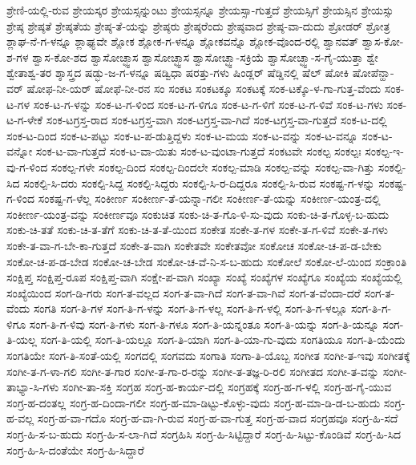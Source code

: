 {ಶ್ರೇಣಿ-ಯಲ್ಲಿ-ರುವ
ಶ್ರೇಯಸ್ಕರ
ಶ್ರೇಯಸ್ಸನ್ನುಂಟು
ಶ್ರೇಯಸ್ಸನ್ನೂ
ಶ್ರೇಯಸ್ಸಾ-ಗುತ್ತದೆ
ಶ್ರೇಯಸ್ಸಿಗೆ
ಶ್ರೇಯಸ್ಸಿನ
ಶ್ರೇಯಸ್ಸು
ಶ್ರೇಷ್ಠ
ಶ್ರೇಷ್ಠತೆ
ಶ್ರೇಷ್ಠತೆಯ
ಶ್ರೇಷ್ಠ-ತೆ-ಯನ್ನು
ಶ್ರೇಷ್ಠರು
ಶ್ರೇಷ್ಠರೆಂದು
ಶ್ರೇಷ್ಠವಾದ
ಶ್ರೇಷ್ಠ-ವಾ-ದುದು
ಶ್ರೋಡರ್
ಶ್ರೋತ್ರ
ಶ್ಲಾಘ-ನೆ-ಗ-ಳನ್ನೂ
ಶ್ಲಾಘ್ಯವೇ
ಶ್ಲೋಕ
ಶ್ಲೋಕ-ಗ-ಳನ್ನೂ
ಶ್ಲೋಕವನ್ನೊ
ಶ್ಲೋಕ-ವೊಂದ-ರಲ್ಲಿ
ಶ್ವಾನವತ್
ಶ್ವಾಸ-ಕೋ-ಶ-ಗಳ
ಶ್ವಾಸ-ಕೋ-ಶದ
ಶ್ವಾಸೋಚ್ಛ್ವಾಸ
ಶ್ವಾಸೋಚ್ಛ್ವಾಸ
ಶ್ವಾಸೋಚ್ಛ್ವಾ-ಸಕ್ರಿಯೆ
ಶ್ವಾಸೋಚ್ಛ್ವಾ-ಸ-ಗೈ-ಯುತ್ತಾ
ಶ್ವೇ
ಶ್ವೇತಾಶ್ವ-ತರ
ಶ್ಶಾಸ್ತ್ರದ
ಷಡ್ಭು-ಜ-ಗ-ಳನ್ನೂ
ಷಡ್ವಿಧಾ
ಷರತ್ತು-ಗಳು
ಷಿಂಡ್ಲರ್
ಷೆಡ್ಡಿನಲ್ಲಿ
ಷೆಲ್
ಷೋಕಿ
ಷೋಪೆನ್ಹಾ-ವರ್
ಷೋಫ-ನೀ-ಯರ್
ಷೋಫೆ-ನೀ-ರನ
ಸಂ
ಸಂಕಟ
ಸಂಕಟಕ್ಕೂ
ಸಂಕಟಕ್ಕೆ
ಸಂಕ-ಟಕ್ಕೊ-ಳ-ಗಾ-ಗುತ್ತ-ವೆಂದು
ಸಂಕ-ಟ-ಗಳ
ಸಂಕ-ಟ-ಗ-ಳನ್ನು
ಸಂಕ-ಟ-ಗ-ಳಿಂದ
ಸಂಕ-ಟ-ಗ-ಳಿಗೂ
ಸಂಕ-ಟ-ಗ-ಳಿಗೆ
ಸಂಕ-ಟ-ಗ-ಳಿವೆ
ಸಂಕ-ಟ-ಗಳು
ಸಂಕ-ಟ-ಗ-ಳೇಕೆ
ಸಂಕ-ಟಗ್ರಸ್ತ-ರಾದ
ಸಂಕ-ಟಗ್ರಸ್ತ-ವಾಗಿ
ಸಂಕ-ಟಗ್ರಸ್ತ-ವಾ-ಗಿದೆ
ಸಂಕ-ಟಗ್ರಸ್ತ-ವಾ-ಗುತ್ತದೆ
ಸಂಕ-ಟ-ದಲ್ಲಿ
ಸಂಕ-ಟ-ದಿಂದ
ಸಂಕ-ಟ-ಪಟ್ಟು
ಸಂಕ-ಟ-ಪ-ಡುತ್ತಿದ್ದಳು
ಸಂಕ-ಟ-ಮಯ
ಸಂಕ-ಟ-ವನ್ನು
ಸಂಕ-ಟ-ವನ್ನೂ
ಸಂಕ-ಟ-ವನ್ನೋ
ಸಂಕ-ಟ-ವಾ-ಗುತ್ತದೆ
ಸಂಕ-ಟ-ವಾ-ಯಿತು
ಸಂಕ-ಟ-ವುಂಟಾ-ಗುತ್ತದೆ
ಸಂಕಟವೇ
ಸಂಕಲ್ಪ
ಸಂಕಲ್ಪಃ
ಸಂಕಲ್ಪ-ಇ-ವು-ಗ-ಳಿಂದ
ಸಂಕಲ್ಪ-ಗಳೇ
ಸಂಕಲ್ಪ-ದಿಂದ
ಸಂಕಲ್ಪ-ದಿಂದಲೇ
ಸಂಕಲ್ಪ-ಮಾಡಿ
ಸಂಕಲ್ಪ-ವನ್ನು
ಸಂಕಲ್ಪ-ವಾ-ಗಿತ್ತು
ಸಂಕಲ್ಪಿ-ಸಿದ
ಸಂಕಲ್ಪಿ-ಸಿ-ದರು
ಸಂಕಲ್ಪಿ-ಸಿದ್ದ
ಸಂಕಲ್ಪಿ-ಸಿದ್ದರು
ಸಂಕಲ್ಪಿ-ಸಿ-ರ-ದಿದ್ದರೂ
ಸಂಕಲ್ಪಿ-ಸಿ-ರುವ
ಸಂಕಷ್ಟ-ಗ-ಳನ್ನು
ಸಂಕಷ್ಟ-ಗ-ಳಿಂದ
ಸಂಕಷ್ಟ-ಗ-ಳೆಲ್ಲ
ಸಂಕೀರ್ಣ
ಸಂಕೀರ್ಣ-ತೆ-ಯನ್ನಾ-ಗಲೀ
ಸಂಕೀರ್ಣ-ತೆ-ಯನ್ನು
ಸಂಕೀರ್ಣ-ಯಂತ್ರ-ದಲ್ಲಿ
ಸಂಕೀರ್ಣ-ಯಂತ್ರ-ವನ್ನು
ಸಂಕೀರ್ಣವೂ
ಸಂಕುಚಿತ
ಸಂಕು-ಚಿ-ತ-ಗೊ-ಳಿ-ಸು-ವುದು
ಸಂಕು-ಚಿ-ತ-ಗೊಳ್ಳ-ಬ-ಹುದು
ಸಂಕು-ಚಿ-ತತೆ
ಸಂಕು-ಚಿ-ತ-ತೆಗೆ
ಸಂಕು-ಚಿ-ತ-ತೆ-ಯಿಂದ
ಸಂಕೇತ
ಸಂಕೇ-ತ-ಗಳ
ಸಂಕೇ-ತ-ಗ-ಳಿವೆ
ಸಂಕೇ-ತ-ಗಳು
ಸಂಕೇ-ತ-ವಾ-ಗ-ಬೇ-ಕಾ-ಗುತ್ತದೆ
ಸಂಕೇ-ತ-ವಾಗಿ
ಸಂಕೇತವೇ
ಸಂಕೇತವೋ
ಸಂಕೋಚ
ಸಂಕೋ-ಚ-ಪ-ಡ-ಬೇಕು
ಸಂಕೋ-ಚ-ಪ-ಡ-ಬೇಡ
ಸಂಕೋ-ಚ-ಬೇಡ
ಸಂಕೋ-ಚ-ವೆ-ನಿ-ಸ-ಬ-ಹುದು
ಸಂಕೋಲೆ
ಸಂಕೋ-ಲೆ-ಯಿಂದ
ಸಂಕ್ರಾಂತಿ
ಸಂಕ್ಷಿಪ್ತ
ಸಂಕ್ಷಿಪ್ತ-ರೂಪ
ಸಂಕ್ಷಿಪ್ತ-ವಾಗಿ
ಸಂಕ್ಷೇ-ಪ-ವಾಗಿ
ಸಂಖ್ಯಾ
ಸಂಖ್ಯೆ
ಸಂಖ್ಯೆಗಳ
ಸಂಖ್ಯೆಗೂ
ಸಂಖ್ಯೆಯ
ಸಂಖ್ಯೆಯಲ್ಲಿ
ಸಂಖ್ಯೆಯಿಂದ
ಸಂಗ-ಡಿ-ಗರು
ಸಂಗ-ತ-ವಲ್ಲದ
ಸಂಗ-ತ-ವಾ-ಗಿದೆ
ಸಂಗ-ತ-ವಾ-ಗಿವೆ
ಸಂಗ-ತ-ವೆಂದಾ-ದರೆ
ಸಂಗ-ತ-ವೆಂದು
ಸಂಗತಿ
ಸಂಗ-ತಿ-ಗಳ
ಸಂಗ-ತಿ-ಗ-ಳನ್ನು
ಸಂಗ-ತಿ-ಗ-ಳಲ್ಲ
ಸಂಗ-ತಿ-ಗ-ಳಲ್ಲಿ
ಸಂಗ-ತಿ-ಗ-ಳಲ್ಲೂ
ಸಂಗ-ತಿ-ಗ-ಳಿಗೂ
ಸಂಗ-ತಿ-ಗ-ಳಿವು
ಸಂಗ-ತಿ-ಗಳು
ಸಂಗ-ತಿ-ಗಳೂ
ಸಂಗ-ತಿ-ಯನ್ನಂತೂ
ಸಂಗ-ತಿ-ಯನ್ನು
ಸಂಗ-ತಿ-ಯನ್ನೂ
ಸಂಗ-ತಿ-ಯಲ್ಲ
ಸಂಗ-ತಿ-ಯಲ್ಲಿ
ಸಂಗ-ತಿ-ಯಲ್ಲೂ
ಸಂಗ-ತಿ-ಯಾಗಿ
ಸಂಗ-ತಿ-ಯಾ-ಗು-ವುದು
ಸಂಗತಿಯೂ
ಸಂಗ-ತಿ-ಯೆಂದು
ಸಂಗತಿಯೇ
ಸಂಗ-ತಿ-ಸಂತೆ-ಯಲ್ಲಿ
ಸಂಗದಲ್ಲಿ
ಸಂಗವದು
ಸಂಗಾತಿ
ಸಂಗಾ-ತಿ-ಯೊಬ್ಬ
ಸಂಗೀತ
ಸಂಗೀ-ತ-ಇವು
ಸಂಗೀತಕ್ಕೆ
ಸಂಗೀ-ತ-ಗ-ಳಾ-ಗಲಿ
ಸಂಗೀ-ತ-ಗಾರ
ಸಂಗೀ-ತ-ಗಾ-ರ-ರನ್ನು
ಸಂಗೀ-ತ-ತಜ್ಞ-ರಿ-ರಲಿ
ಸಂಗೀತದ
ಸಂಗೀ-ತ-ವನ್ನು
ಸಂಗೀ-ತಾಭ್ಯಾ-ಸಿ-ಗಳು
ಸಂಗೀ-ತಾ-ಸಕ್ತಿ
ಸಂಗ್ರಹ
ಸಂಗ್ರ-ಹ-ಕಾರ್ಯ-ದಲ್ಲಿ
ಸಂಗ್ರಹಕ್ಕೆ
ಸಂಗ್ರ-ಹ-ಗ-ಳಲ್ಲಿ
ಸಂಗ್ರ-ಹ-ಗೈ-ಯುವ
ಸಂಗ್ರ-ಹ-ದಂತಲ್ಲ
ಸಂಗ್ರ-ಹ-ದಿಂದಾ-ಗಲೀ
ಸಂಗ್ರ-ಹ-ಮಾ-ಡಿಟ್ಟು-ಕೊಳ್ಳು-ವುದು
ಸಂಗ್ರ-ಹ-ಮಾ-ಡಿ-ಡ-ಬ-ಹುದು
ಸಂಗ್ರ-ಹ-ವಲ್ಲ
ಸಂಗ್ರ-ಹ-ವಾ-ಗದೊ
ಸಂಗ್ರ-ಹ-ವಾ-ಗಿ-ರುವ
ಸಂಗ್ರ-ಹ-ವಾ-ಗುತ್ತ
ಸಂಗ್ರ-ಹ-ವಾದ
ಸಂಗ್ರಹವೂ
ಸಂಗ್ರ-ಹಿ-ಸದೆ
ಸಂಗ್ರ-ಹಿ-ಸ-ಬ-ಹುದು
ಸಂಗ್ರ-ಹಿ-ಸ-ಲಾ-ಗಿದೆ
ಸಂಗ್ರಹಿಸಿ
ಸಂಗ್ರ-ಹಿ-ಸಿಟ್ಟಿದ್ದಾರೆ
ಸಂಗ್ರ-ಹಿ-ಸಿಟ್ಟು-ಕೊಂಡಿವೆ
ಸಂಗ್ರ-ಹಿ-ಸಿದ
ಸಂಗ್ರ-ಹಿ-ಸಿ-ದಂತೆಯೇ
ಸಂಗ್ರ-ಹಿ-ಸಿದ್ದಾರೆ
}
